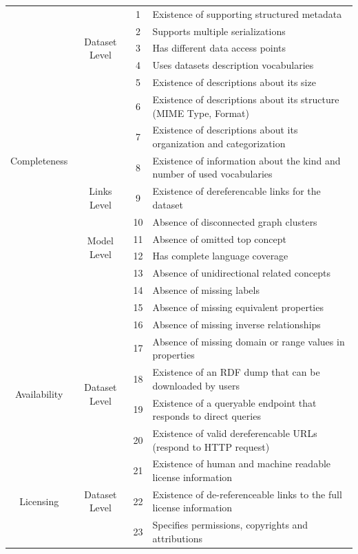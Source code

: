 \documentclass[onecolumn, crcready]{iosart2c}
\begin{document}
\begin{center}
{\begin{longtable}[h]{|c|c|c|l|}
\multirow{15}{*}{Completeness}
 & \multirow{5}{*}{Dataset Level} & 1 & Existence of supporting structured metadata  \cite{Hogan2010}\tabularnewline
\cline{3-4}
 &  & 2 & Supports multiple serializations \cite{Framework2012}\tabularnewline
\cline{3-4}
 &  & 3 & Has different data access points \tabularnewline
\cline{3-4}
 &  & 4 & Uses datasets description vocabularies \tabularnewline
\cline{3-4}
 &  & 5 & Existence of descriptions about its size \tabularnewline
 \cline{3-4}
 &  & 6 & Existence of descriptions about its structure (MIME Type, Format) \tabularnewline
 \cline{3-4}
 &  & 7 & Existence of descriptions about its organization and categorization \tabularnewline
 \cline{3-4}
 &  & 8 & Existence of information about the kind and number of used vocabularies \cite{Framework2012}\tabularnewline
\cline{2-4}
 & \multirow{1}{*}{Links Level} & 9 & Existence of dereferencable links for the dataset \cite{Hogan2010}\cite{Mader2012}\cite{Gueret2012}\tabularnewline \hline
\cline{2-4}
 & \multirow{4}{*}{Model Level} & 10 & Absence of disconnected graph clusters \cite{Mader2012}\tabularnewline
\cline{3-4}
 &  & 11 & Absence of omitted top concept \cite{Hogan2010}\tabularnewline
 \cline{3-4}
 &  & 12 & Has complete language coverage \cite{Mader2012}\tabularnewline
\cline{3-4}
 &  & 13 & Absence of unidirectional related concepts \cite{Hogan2010}\tabularnewline
 \cline{3-4}
 &  & 14 & Absence of missing labels \cite{Mader2012}\tabularnewline
 \cline{3-4}
 &  & 15 & Absence of missing equivalent properties \cite{DBLP:conf/ic3k/KeetSP13}\tabularnewline
 \cline{3-4}
 &  & 16 & Absence of missing inverse relationships \cite{DBLP:conf/ic3k/KeetSP13}\tabularnewline
 \cline{3-4}
 &  & 17 & Absence of missing domain or range values in properties \cite{DBLP:conf/ic3k/KeetSP13}\tabularnewline
\hline
\hline
\multirow{2}{*}{Availability} & \multirow{2}{*}{Dataset Level} & 18 & Existence of an RDF dump that can be downloaded by users \cite{flemming2010}\cite{Hogan2010}\tabularnewline
\cline{3-4}
 &  & 19 & Existence of a queryable endpoint that responds to direct queries \tabularnewline
\cline{3-4}
 &  & 20 & Existence of valid dereferencable URLs (respond to HTTP request) \tabularnewline
\hline
\hline
\multirow{3}{*}{Licensing} & \multirow{3}{*}{Dataset Level} & 21 & Existence of human and machine readable license information \cite{Hogan:2012:ESL:2263498.2264570}\tabularnewline
\cline{3-4}
 &  & 22 & Existence of de-referenceable links to the full license information  \cite{Hogan:2012:ESL:2263498.2264570}\tabularnewline
\cline{3-4}
 &  & 23 & Specifies permissions, copyrights and attributions  \cite{Framework2012}\tabularnewline

\end{longtable}}
\end{center}
\end{document}
